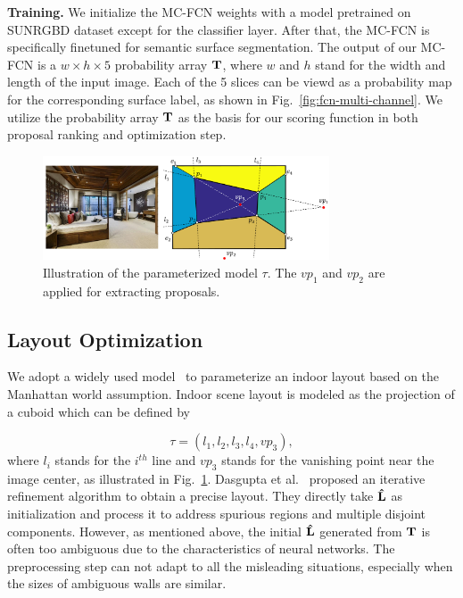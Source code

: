 \noindent\textbf{Training.} We initialize the MC-FCN weights with a model pretrained on SUNRGBD dataset except for the classifier layer. After that, the MC-FCN is specifically finetuned for semantic surface segmentation.
%
The output of our MC-FCN is a $w\times h \times 5$ probability array $\mathbf{T}$, where $w$ and $h$ stand for the width and length of the input image. Each of the 5 slices can be viewd as a probability map for the corresponding surface label, as shown in Fig.~\ref{fig:fcn-multi-channel}. We utilize the probability array $\mathbf{T}$ as the basis for our scoring function in both proposal ranking and optimization step. 



\begin{figure}
	\centering
	\includegraphics[width=8.5cm]{figure/parameterization.png}
	\caption{ Illustration of the parameterized model $\tau$. The $vp_1$ and $vp_2$ are applied for extracting proposals. }
	\label{fig:parameterization}
\end{figure}


\subsection{Layout Optimization}
\label{sec:optimization}
We adopt a widely used model~\cite{hedau2009recovering, wang2013discriminative, dasgupta2016delay, ren2016coarse} to parameterize an indoor layout based on the Manhattan world assumption. Indoor scene layout is modeled as the projection of a cuboid which can be defined by 

\begin{equation}
	\label{eq:Layout}
	\tau = (l_1, l_2, l_3, l_4, vp_3),
\end{equation}
%
where $l_{i}$ stands for the $i^{th}$ line and $vp_3$ stands for the vanishing point near the image center, as illustrated in Fig.~\ref{fig:parameterization}.
%
Dasgupta et al.~\cite{dasgupta2016delay} proposed an iterative refinement algorithm to obtain a precise layout. 
They directly take $\mathbf{\hat{L}}$ as initialization and process it to address spurious regions and multiple disjoint components. 
However, as mentioned above, the initial $\mathbf{\hat{L}}$ generated from $\mathbf{T}$ is often too ambiguous due to the characteristics of neural networks. 
The preprocessing step can not adapt to all the misleading situations, especially when the sizes of ambiguous walls are similar. 

